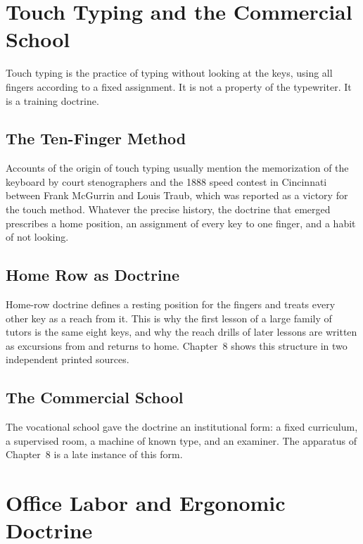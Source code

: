 \chapter{Touch Typing and the Commercial School}

Touch typing is the practice of typing without looking at the keys, using all fingers according to a fixed assignment. It is not a property of the typewriter. It is a training doctrine.

\section{The Ten-Finger Method}

Accounts of the origin of touch typing usually mention the memorization of the keyboard by court stenographers and the 1888 speed contest in Cincinnati between Frank McGurrin and Louis Traub, which was reported as a victory for the touch method.  Whatever the precise history, the doctrine that emerged prescribes a home position, an assignment of every key to one finger, and a habit of not looking.

\section{Home Row as Doctrine}

Home-row doctrine defines a resting position for the fingers and treats every other key as a reach from it. This is why the first lesson of a large family of tutors is the same eight keys, and why the reach drills of later lessons are written as excursions from and returns to home. Chapter~8 shows this structure in two independent printed sources.

\section{The Commercial School}

The vocational school gave the doctrine an institutional form: a fixed curriculum, a supervised room, a machine of known type, and an examiner. The apparatus of Chapter~8 is a late instance of this form. 

\chapter{Office Labor and Ergonomic Doctrine}

